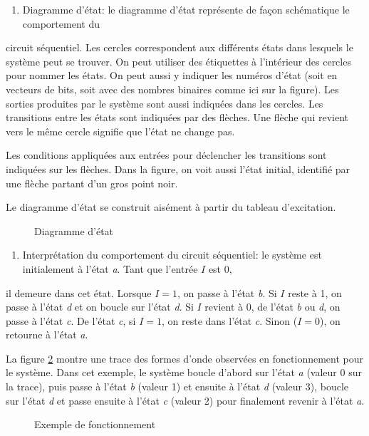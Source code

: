 \documentclass[11pt]{article}
\begin{document}
\begin{enumerate}
\item Diagramme d'état: le diagramme d'état représente de façon schématique le comportement du
\end{enumerate}
circuit séquentiel. Les cercles correspondent aux différents états
dans lesquels le système peut se trouver. On peut utiliser des
étiquettes à l'intérieur des cercles pour nommer les états. On peut
aussi y indiquer les numéros d'état (soit en vecteurs de bits, soit
avec des nombres binaires comme ici sur la figure). Les sorties
produites par le système sont aussi indiquées dans les cercles.  Les
transitions entre les états sont indiquées par des flèches. Une flèche
qui revient vers le même cercle signifie que l'état ne change pas.

Les conditions appliquées aux entrées pour déclencher les transitions
sont indiquées sur les flèches. Dans la figure, on voit aussi l'état
initial, identifié par une flèche partant d'un gros point noir.

Le diagramme d'état se construit aisément à partir du tableau
d'excitation.

\begin{figure}[htbp]
\centering

\caption{\label{fig:orgb3b5728}Diagramme d'état}
\end{figure}

\begin{enumerate}
\item Interprétation du comportement du circuit séquentiel: le système est initialement à l'état \emph{a}. Tant que l'entrée \(I\) est 0,
\end{enumerate}
il demeure dans cet état. Lorsque \(I=1\), on passe à l'état \emph{b}. Si
\(I\) reste à 1, on passe à l'état \emph{d} et on boucle sur l'état \emph{d}. Si
\(I\) revient à 0, de l'état \emph{b} ou \emph{d}, on passe à l'état \emph{c}. De l'état \emph{c},
si \(I = 1\), on reste dans l'état \emph{c}. Sinon (\(I = 0\)), on retourne à
l'état \emph{a}.

La figure \ref{fig:orge131696} montre une trace des formes d'onde
observées en fonctionnement pour le système. Dans cet exemple, le
système boucle d'abord sur l'état \emph{a} (valeur 0 sur la trace), puis
passe à l'état \emph{b} (valeur 1) et ensuite à l'état \emph{d} (valeur 3),
boucle sur l'état \emph{d} et passe ensuite à l'état \emph{c} (valeur 2) pour
finalement revenir à l'état \emph{a}.

\begin{figure}[htbp]
\centering

\caption{\label{fig:orge131696}Exemple de fonctionnement}
\end{figure}
\end{document}
